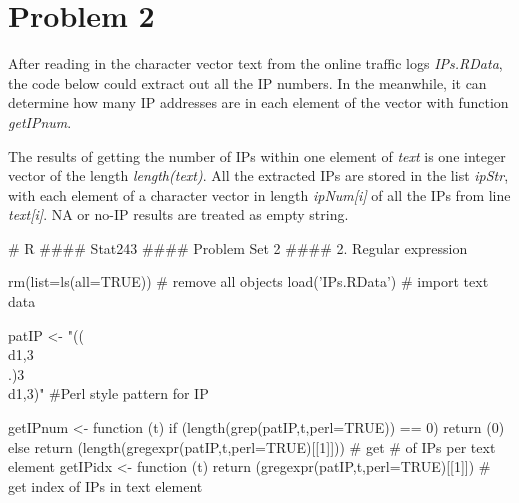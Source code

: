 \documentclass{article}
\begin{document}
\newpage
\section*{Problem 2}

After reading in the character vector text from the online traffic logs \textit{IPs.RData}, the 
code below could extract out all the IP numbers. In the meanwhile, it can determine how many IP 
addresses are in each element of the vector with function \textit{getIPnum}.


The results of getting the number of IPs within one element of \textit{text} is one integer vector of 
the length \textit{length(text)}. All the extracted IPs are stored in the list \textit{ipStr}, 
with each element of a character vector in length \textit{ipNum[i]} of all the IPs from line \textit{text[i]}.
NA or no-IP results are treated as empty string.

# R
#### Stat243
#### Problem Set 2
#### 2. Regular expression

rm(list=ls(all=TRUE)) # remove all objects
load('IPs.RData') # import text data

patIP <- "((\\d{1,3}\\.){3}\\d{1,3})" #Perl style pattern for IP

getIPnum <- function (t) { if (length(grep(patIP,t,perl=TRUE)) == 0) {return (0)}
                           else {
                           return (length(gregexpr(patIP,t,perl=TRUE)[[1]]))
                           }
                         } # get # of IPs per text element
getIPidx <- function (t) { return (gregexpr(patIP,t,perl=TRUE)[[1]]) } # get index of IPs in text element
\end{document}
